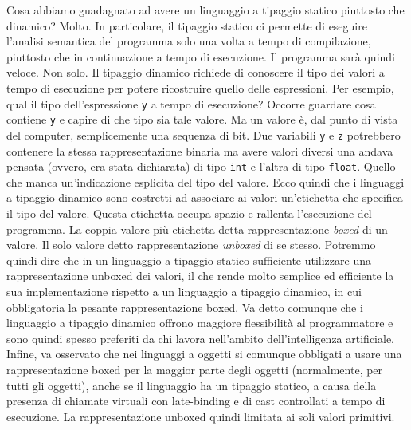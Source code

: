 Cosa abbiamo guadagnato ad avere un linguaggio a tipaggio statico piuttosto
che dina\-mico? Molto. In particolare, il tipaggio statico ci permette di
eseguire l'analisi semantica del programma solo una volta a tempo di
compilazione, piuttosto che in continuazione a tempo di esecuzione.
Il programma sar\`a quindi \piu veloce. Non solo. Il tipaggio dinamico richiede
di conoscere il tipo dei valori a tempo di esecuzione per potere
ricostruire quello delle espressioni. Per
esempio, qual \e il tipo dell'espressione \texttt{y} a tempo di esecuzione?
Occorre guardare cosa contiene \texttt{y} e capire di che tipo sia tale valore.
Ma un valore \`e, dal punto di vista del computer, semplicemente una sequenza
di bit. Due variabili \texttt{y} e \texttt{z} potrebbero contenere la
stessa rappresentazione binaria ma avere valori diversi \poiche una
andava pensata (ovvero, era stata dichiarata)
di tipo \texttt{int} e l'altra di tipo \texttt{float}.
Quello che manca \e un'indicazione esplicita del tipo del valore.
Ecco quindi che i linguaggi a tipaggio dinamico sono costretti
ad associare ai valori un'etichetta che specifica il tipo del valore.
Questa etichetta occupa spazio e rallenta l'esecuzione del programma.
La coppia valore pi\`u etichetta \e detta rappresentazione \emph{boxed} di
un valore. Il solo valore \e detto rappresentazione \emph{unboxed} di
se stesso. Potremmo quindi dire che in un linguaggio a tipaggio statico
\e sufficiente utilizzare una rappresentazione unboxed dei valori, il che
rende molto \piu semplice ed efficiente la sua implementazione rispetto
a un linguaggio a tipaggio dinamico, in cui \e obbligatoria la \piu pesante
rappresentazione boxed. Va detto comunque che i linguaggio
a tipaggio dinamico offrono maggiore flessibilit\`a al programmatore e sono
quindi spesso preferiti da chi lavora nell'ambito
dell'intelligenza artificiale. Infine, va osservato che nei linguaggi a
oggetti si \e comunque obbligati a usare una rappresentazione boxed per la
maggior parte degli oggetti (normalmente, per tutti gli oggetti),
anche se il linguaggio ha un tipaggio statico,
a causa della presenza di chiamate virtuali con late-binding
e di cast controllati a tempo di esecuzione. La rappresentazione unboxed
\e quindi limitata ai soli valori primitivi.

